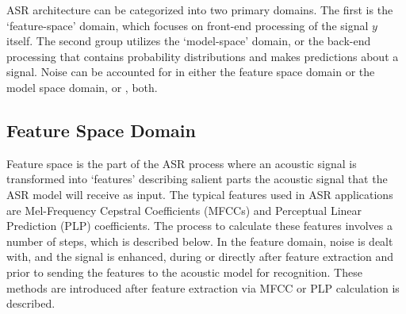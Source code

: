 ASR architecture can be categorized into two primary domains. The first is the `feature-space' domain, which focuses on front-end processing of the signal $y$ itself.  The second group utilizes the `model-space' domain, or the back-end processing that contains probability distributions and makes predictions about a signal. %
Noise can be accounted for in either the feature space domain or the model space domain, or \DIFdelbegin {}\DIFdelend \DIFaddbegin {}\DIFaddend , both.  %

\subsection{Feature Space Domain}

Feature space is the part of the ASR process where an acoustic signal is transformed into `features' describing salient parts the acoustic signal that the ASR model will receive as input. The typical features used in ASR applications are Mel-Frequency Cepstral Coefficients (MFCCs) and Perceptual Linear Prediction (PLP) coefficients. The process to calculate these features involves a number of steps, which is described below.  In the feature domain, noise is dealt with, and the signal is enhanced, during or directly after feature extraction and prior to sending the features to the acoustic model for recognition.  These methods are introduced after feature extraction via MFCC or PLP calculation is described.

